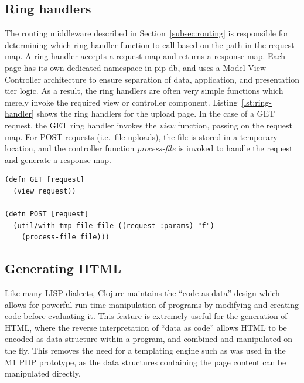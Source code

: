 \subsection{Ring handlers}\label{subsec:ring-handler}

The routing middleware described in Section~\ref{subsec:routing} is
responsible for determining which ring handler function to call based
on the path in the request map. A ring handler accepts a request map
and returns a response map. Each page has its own dedicated namespace
in pip-db, and uses a Model View Controller architecture to ensure
separation of data, application, and presentation tier logic. As a
result, the ring handlers are often very simple functions which merely
invoke the required view or controller
component. Listing~\ref{lst:ring-handler} shows the ring handlers for
the upload page. In the case of a GET request, the GET ring handler
invokes the \textit{view} function, passing on the request map. For
POST requests (i.e.\ file uploads), the file is stored in a temporary
location, and the controller function \textit{process-file} is invoked
to handle the request and generate a response map.\\

\lstset{language=clojure}
\begin{lstlisting}[label=lst:ring-handler,caption={%
      [Upload page ring handlers]
       Upload page ring handlers, taken from \texttt{pages/upload.clj}.}]
(defn GET [request]
  (view request))

(defn POST [request]
  (util/with-tmp-file file ((request :params) "f")
    (process-file file)))
\end{lstlisting}

\subsection{Generating HTML}\label{subsec:generating-html}

Like many LISP dialects, Clojure maintains the ``code as data'' design
which allows for powerful run time manipulation of programs by
modifying and creating code before evaluating it. This feature is
extremely useful for the generation of HTML, where the reverse
interpretation of ``data as code'' allows HTML to be encoded as data
structure within a program, and combined and manipulated on the
fly. This removes the need for a templating engine such as was used in
the M1 PHP prototype, as the data structures containing the page
content can be manipulated directly.


